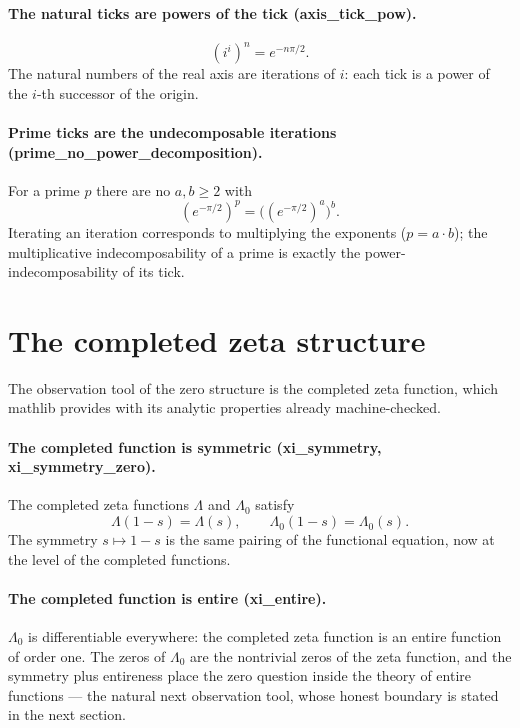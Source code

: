 \documentclass[sigplan,10pt,anonymous,review]{acmart}
\begin{document}
\paragraph{The natural ticks are powers of the tick
(axis\_tick\_pow).}
\begin{equation*}
  (i^i)^n = e^{-n\pi/2}.
\end{equation*}
The natural numbers of the real axis are iterations of $i$: each tick
is a power of the $i$-th successor of the origin.

\paragraph{Prime ticks are the undecomposable iterations
(prime\_no\_power\_decomposition).} For a prime $p$ there are no
$a, b \geq 2$ with
\begin{equation*}
  (e^{-\pi/2})^p = \big((e^{-\pi/2})^a\big)^b.
\end{equation*}
Iterating an iteration corresponds to multiplying the exponents
($p = a \cdot b$); the multiplicative indecomposability of a prime is
exactly the power-indecomposability of its tick.

\section{The completed zeta structure}

The observation tool of the zero structure is the completed zeta
function, which mathlib provides with its analytic properties already
machine-checked.

\paragraph{The completed function is symmetric
(xi\_symmetry, xi\_symmetry\_zero).} The completed zeta functions
$\Lambda$ and $\Lambda_0$ satisfy
\begin{equation*}
  \Lambda(1-s) = \Lambda(s), \qquad \Lambda_0(1-s) = \Lambda_0(s).
\end{equation*}
The symmetry $s \mapsto 1-s$ is the same pairing of the functional
equation, now at the level of the completed functions.

\paragraph{The completed function is entire (xi\_entire).}
$\Lambda_0$ is differentiable everywhere: the completed zeta function
is an entire function of order one. The zeros of $\Lambda_0$ are the
nontrivial zeros of the zeta function, and the symmetry plus
entireness place the zero question inside the theory of entire
functions --- the natural next observation tool, whose honest boundary
is stated in the next section.
\end{document}
